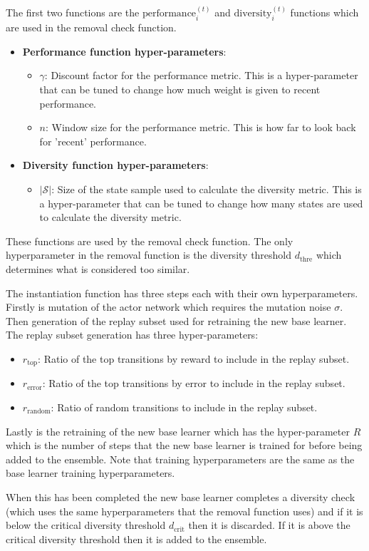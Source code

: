 The first two functions are the $\text{performance}_i^{(t)}$ and $\text{diversity}_i^{(t)}$ functions which are used in the removal check function.
\begin{itemize}
    \item \textbf{Performance function hyper-parameters}:
    \begin{itemize}
        \item $\gamma$: Discount factor for the performance metric. This is a hyper-parameter that can be tuned to change how much weight is given to recent performance.
        \item $n$: Window size for the performance metric. This is how far to look back for 'recent' performance.
    \end{itemize}
    \item \textbf{Diversity function hyper-parameters}:
    \begin{itemize}
        \item $|\mathcal{S}|$: Size of the state sample used to calculate the diversity metric. This is a hyper-parameter that can be tuned to change how many states are used to calculate the diversity metric.
    \end{itemize}
\end{itemize}

These functions are used by the removal check function. The only hyperparameter in the removal function is the diversity threshold $d_{\text{thre}}$ which determines what is considered too similar.

The instantiation function has three steps each with their own hyperparameters. Firstly is mutation of the actor network which requires the mutation noise $\sigma$. Then generation of the replay subset used for retraining the new base learner. The replay subset generation has three hyper-parameters:
\begin{itemize}
    \item $r_{\text{top}}$: Ratio of the top transitions by reward to include in the replay subset.
    \item $r_{\text{error}}$: Ratio of the top transitions by error to include in the replay subset.
    \item $r_{\text{random}}$: Ratio of random transitions to include in the replay subset.
\end{itemize}

Lastly is the retraining of the new base learner which has the hyper-parameter $R$ which is the number of steps that the new base learner is trained for before being added to the ensemble. Note that training hyperparameters are the same as the base learner training hyperparameters.

When this has been completed the new base learner completes a diversity check (which uses the same hyperparameters that the removal function uses) and if it is below the critical diversity threshold $d_{\text{crit}}$ then it is discarded. If it is above the critical diversity threshold then it is added to the ensemble.